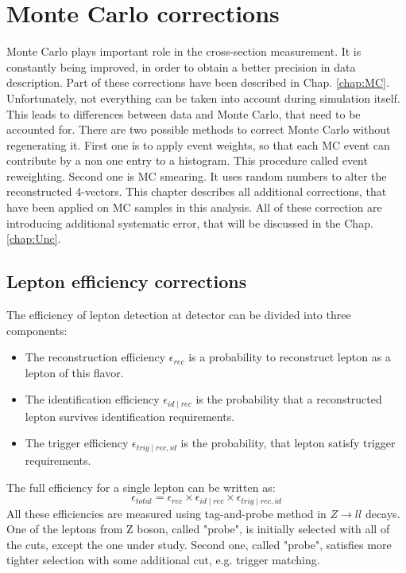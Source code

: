 \chapter{Monte Carlo corrections}\label{chap:MCCor}
Monte Carlo plays important role in the cross-section measurement. It is constantly being improved, in order to obtain a better precision in data description. Part of these corrections have been described in Chap. \ref{chap:MC}. Unfortunately, not everything can be taken into account during simulation itself. This leads to differences between data and Monte Carlo, that need to be accounted for. There are two possible methods to correct Monte Carlo without regenerating it. First one is to apply event weights, so that each MC event can contribute by a non one entry to a histogram. This procedure called event reweighting. Second one is MC smearing. It uses random numbers to alter the reconstructed 4-vectors. 
This chapter describes all additional corrections, that have been applied on MC samples in this analysis. All of these correction are introducing additional systematic error, that will be discussed in the Chap. \ref{chap:Unc}.

\section{Lepton efficiency corrections}

The efficiency of lepton detection at \atlas detector can be divided into three components:
\begin{itemize}
\item The reconstruction efficiency $\epsilon_{rec}$ is a probability to reconstruct lepton as a lepton of this flavor.
\item The identification efficiency $\epsilon_{id \mid rec}$ is the probability that a reconstructed lepton survives  identification requirements. 
\item The trigger efficiency $\epsilon_{trig \mid rec,id}$ is the probability, that lepton satisfy trigger requirements. 
\end{itemize}
The full efficiency for a single lepton can be written as:
\begin{equation}
\epsilon_{total}=\epsilon_{rec} \times \epsilon_{id \mid rec} \times \epsilon_{trig \mid rec,id}
\end{equation}
All these efficiencies are measured using tag-and-probe method in $Z\to ll$ decays.  One of the leptons from Z boson, called "probe", is initially selected with all of the cuts, except the one under study. Second one, called "probe", satisfies more tighter selection with some additional cut, e.g. trigger matching.


